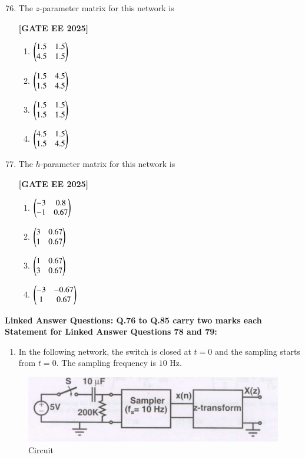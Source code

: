 \documentclass[12pt]{article}
\begin{document}
\begin{enumerate}[leftmargin=*, label=\textbf{Q.\arabic*:}]
\setcounter{enumi}{75}

\item The $z$-parameter matrix for this network is
 
\noindent \textbf{[GATE EE 2025]}
\begin{enumerate}
  \item $\begin{pmatrix} 1.5 & 1.5 \\ 4.5 & 1.5 \end{pmatrix}$
  \item $\begin{pmatrix} 1.5 & 4.5 \\ 1.5 & 4.5 \end{pmatrix}$
  \item $\begin{pmatrix} 1.5 & 1.5 \\ 1.5 & 1.5 \end{pmatrix}$
  \item $\begin{pmatrix} 4.5 & 1.5 \\ 1.5 & 4.5 \end{pmatrix}$
\end{enumerate}

\item The $h$-parameter matrix for this network is
 
\noindent \textbf{[GATE EE 2025]}
\begin{enumerate}
  \item $\begin{pmatrix} -3 & 0.8 \\ -1 & 0.67 \end{pmatrix}$
  \item $\begin{pmatrix} 3 & 0.67 \\ 1 & 0.67 \end{pmatrix}$
  \item $\begin{pmatrix} 1 & 0.67 \\ 3 & 0.67 \end{pmatrix}$
  \item $\begin{pmatrix} -3 & -0.67 \\ 1 & 0.67 \end{pmatrix}$
\end{enumerate}

\end{enumerate}


 \large \textbf {Linked Answer Questions: Q.76 to Q.85 carry two marks each}
 \large \textbf {Statement for Linked Answer Questions 78 and 79: }

 \begin{enumerate}
\item In the following network, the switch is closed at $t=0$ and the sampling starts from $t=0$. The sampling frequency is $10$ Hz.
\end{enumerate}
\begin{figure}[H]\centering
\includegraphics[width=0.6\columnwidth]{figs/q7879.png}
\caption{Circuit}
\label{fig:q7879}
\end{figure}
\end{document}
